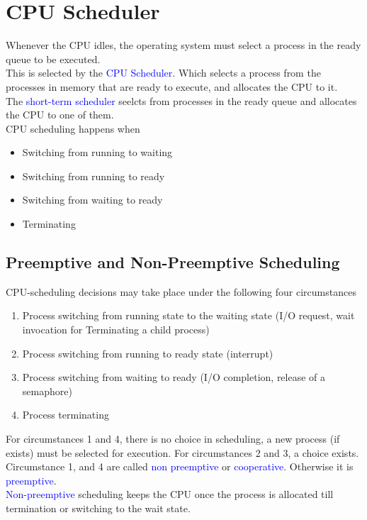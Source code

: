 \documentclass{book/custombook}
\begin{document}
        \section{CPU Scheduler}
            Whenever the CPU idles, the operating system must select a process in the ready queue to be 
            executed.\\
            This is selected by the \textcolor{blue}{CPU Scheduler}. Which selects a process from the processes
            in memory that are ready to execute, and allocates the CPU to it.\\
            The \textcolor{blue}{short-term scheduler} seelcts from processes in the ready queue and allocates 
            the CPU to one of them.\\
            CPU scheduling happens when
            \begin{itemize}
                \item Switching from running to waiting
                \item Switching from running to ready
                \item Switching from waiting to ready
                \item Terminating
            \end{itemize}
            \subsection{Preemptive and Non-Preemptive Scheduling}
                CPU-scheduling decisions may take place under the following four circumstances
                \begin{enumerate}
                    \item Process switching from running state to the waiting state (I/O request, wait invocation for Terminating
                    a child process)
                    \item Process switching from running to ready state (interrupt)
                    \item Process switching from waiting to ready (I/O completion, release of a semaphore)
                    \item Process terminating
                \end{enumerate}
                For circumstances 1 and 4, there is no choice in scheduling, a new process (if exists) must be
                selected for execution. For circumstances 2 and 3, a choice exists.\\
                Circumstance 1, and 4 are called \textcolor{blue}{non preemptive} or \textcolor{blue}{cooperative}.
                Otherwise it is \textcolor{blue}{preemptive}.\\
                \textcolor{blue}{Non-preemptive} scheduling keeps the CPU once the process is allocated till termination
                or switching to the wait state.
\end{document}
